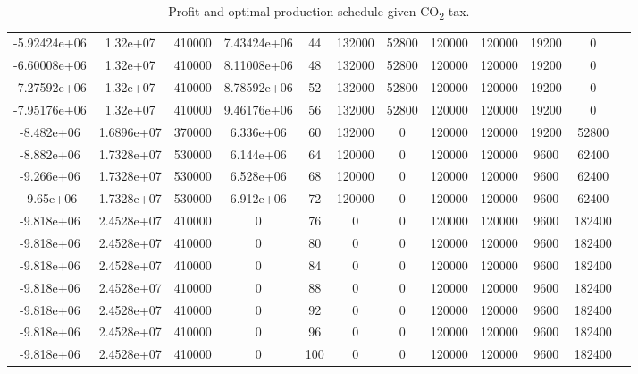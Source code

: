 \documentclass[twocolumn]{article}
\begin{document}
\begin{landscape}
\begin{table}[H]
\begin{tabular}{cccccccccccc}
-5.92424e+06 & 1.32e+07         & 410000            & 7.43424e+06             & 44       & 132000 & 52800 & 120000  & 120000 & 19200 & 0            &  \\
-6.60008e+06 & 1.32e+07         & 410000            & 8.11008e+06             & 48       & 132000 & 52800 & 120000  & 120000 & 19200 & 0            &  \\
-7.27592e+06 & 1.32e+07         & 410000            & 8.78592e+06             & 52       & 132000 & 52800 & 120000  & 120000 & 19200 & 0            &  \\
-7.95176e+06 & 1.32e+07         & 410000            & 9.46176e+06             & 56       & 132000 & 52800 & 120000  & 120000 & 19200 & 0            &  \\
-8.482e+06   & 1.6896e+07       & 370000            & 6.336e+06               & 60       & 132000 & 0     & 120000  & 120000 & 19200 & 52800        &  \\
-8.882e+06   & 1.7328e+07       & 530000            & 6.144e+06               & 64       & 120000 & 0     & 120000  & 120000 & 9600  & 62400        &  \\
-9.266e+06   & 1.7328e+07       & 530000            & 6.528e+06               & 68       & 120000 & 0     & 120000  & 120000 & 9600  & 62400        &  \\
-9.65e+06    & 1.7328e+07       & 530000            & 6.912e+06               & 72       & 120000 & 0     & 120000  & 120000 & 9600  & 62400        &  \\
-9.818e+06   & 2.4528e+07       & 410000            & 0                       & 76       & 0      & 0     & 120000  & 120000 & 9600  & 182400       &  \\
-9.818e+06   & 2.4528e+07       & 410000            & 0                       & 80       & 0      & 0     & 120000  & 120000 & 9600  & 182400       &  \\
-9.818e+06   & 2.4528e+07       & 410000            & 0                       & 84       & 0      & 0     & 120000  & 120000 & 9600  & 182400       &  \\
-9.818e+06   & 2.4528e+07       & 410000            & 0                       & 88       & 0      & 0     & 120000  & 120000 & 9600  & 182400       &  \\
-9.818e+06   & 2.4528e+07       & 410000            & 0                       & 92       & 0      & 0     & 120000  & 120000 & 9600  & 182400       &  \\
-9.818e+06   & 2.4528e+07       & 410000            & 0                       & 96       & 0      & 0     & 120000  & 120000 & 9600  & 182400       &  \\
-9.818e+06   & 2.4528e+07       & 410000            & 0                       & 100      & 0      & 0     & 120000  & 120000 & 9600  & 182400       &  \\ \hline
\end{tabular}
        \caption{Profit and optimal production schedule given CO\textsubscript{2} tax.\label{table:carbon_tax}}
    \end{table}
    
\end{landscape}
\restoregeometry
    
\end{document}

